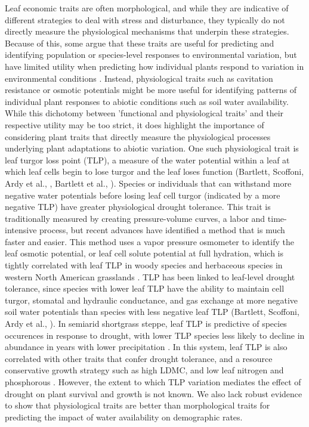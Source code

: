 \documentclass[12pt, letterpaper]{article}
\begin{document}
Leaf economic traits are often morphological, and while they are indicative of different strategies to deal with stress and disturbance, they typically do not directly measure the physiological mechanisms that underpin these strategies. Because of this, some argue that these traits are useful for predicting and identifying population or species-level responses to environmental variation, but have limited utility when predicting how individual plants respond to variation in environmental conditions \cite{Volaire2018}. Instead, physiological traits such as cavitation resistance or osmotic potentials might be more useful for identifying patterns of individual plant responses to abiotic conditions such as soil water availability. While this dichotomy between ’functional and physiological traits’ and their respective utility may be too strict, it does highlight the importance of considering plant traits that directly measure the physiological processes underlying plant adaptations to abiotic variation.
One such physiological trait is leaf turgor loss point (TLP), a measure of the water potential within a leaf at which leaf cells begin to lose turgor and the leaf loses function (Bartlett, Scoffoni, Ardy et al., , Bartlett et al., ). Species or individuals that can withstand more negative water potentials before losing leaf cell turgor (indicated by a more negative TLP) have greater physiological drought tolerance. This trait is traditionally measured by creating pressure-volume curves, a labor and time-intensive process, but recent advances have identified a method that is much faster and easier. This method uses a vapor pressure osmometer to identify the leaf osmotic potential, or leaf cell solute potential at full hydration, which is tightly correlated with leaf TLP in woody species \cite{Bartlett2012a} and herbaceous species in western North American grasslands \cite{Griffin-Nolan2019}. TLP has been linked to leaf-level drought tolerance, since species with lower leaf TLP have the ability to maintain cell turgor, stomatal and hydraulic conductance, and gas exchange at more negative soil water potentials than species with less negative leaf TLP (Bartlett, Scoffoni, Ardy et al., ). In semiarid shortgrass steppe, leaf TLP is predictive of species occurences in response to drought, with lower TLP species less likely to decline in abundance in years with lower precipitation \cite{Wilcox2020PlantPrairie}. In this system, leaf TLP is also correlated with other traits that confer drought tolerance, and a resource conservative growth strategy such as high LDMC, and low leaf nitrogen and phosphorous \cite{Blumenthal2020}. However, the extent to which TLP variation mediates the effect of drought on plant survival and growth is not known. We also lack robust evidence to show that physiological traits are better than morphological traits for predicting the impact of water availability on demographic rates.
\end{document}

